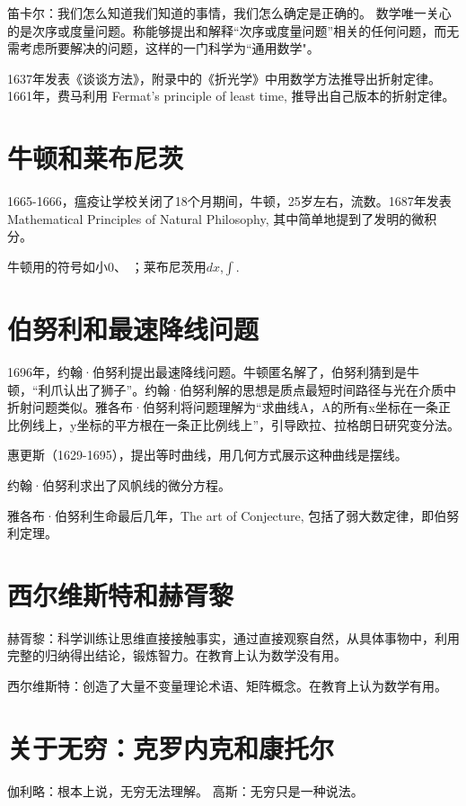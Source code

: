 \documentclass[UTF8]{../09-Mathematics}
\begin{document}
笛卡尔：我们怎么知道我们知道的事情，我们怎么确定是正确的。
数学唯一关心的是次序或度量问题。称能够提出和解释“次序或度量问题”相关的任何问题，而无需考虑所要解决的问题，这样的一门科学为“通用数学"。

1637年发表《谈谈方法》，附录中的《折光学》中用数学方法推导出折射定律。1661年，费马利用 Fermat's principle of least time, 推导出自己版本的折射定律。


\section{牛顿和莱布尼茨}

1665-1666，瘟疫让学校关闭了18个月期间，牛顿，25岁左右，流数。1687年发表 Mathematical Principles of Natural Philosophy, 其中简单地提到了发明的微积分。

牛顿用的符号如小0、 ；莱布尼茨用$dx$,$\int $.


\section{伯努利和最速降线问题}

1696年，约翰·伯努利提出最速降线问题。牛顿匿名解了，伯努利猜到是牛顿，“利爪认出了狮子”。约翰·伯努利解的思想是质点最短时间路径与光在介质中折射问题类似。雅各布·伯努利将问题理解为“求曲线A，A的所有x坐标在一条正比例线上，y坐标的平方根在一条正比例线上”，引导欧拉、拉格朗日研究变分法。

惠更斯（1629-1695），提出等时曲线，用几何方式展示这种曲线是摆线。

约翰·伯努利求出了风帆线的微分方程。

雅各布·伯努利生命最后几年，The art of Conjecture, 包括了弱大数定律，即伯努利定理。


\section{西尔维斯特和赫胥黎}
赫胥黎：科学训练让思维直接接触事实，通过直接观察自然，从具体事物中，利用完整的归纳得出结论，锻炼智力。在教育上认为数学没有用。

西尔维斯特：创造了大量不变量理论术语、矩阵概念。在教育上认为数学有用。


\section{关于无穷：克罗内克和康托尔}

伽利略：根本上说，无穷无法理解。
高斯：无穷只是一种说法。
\end{document}
